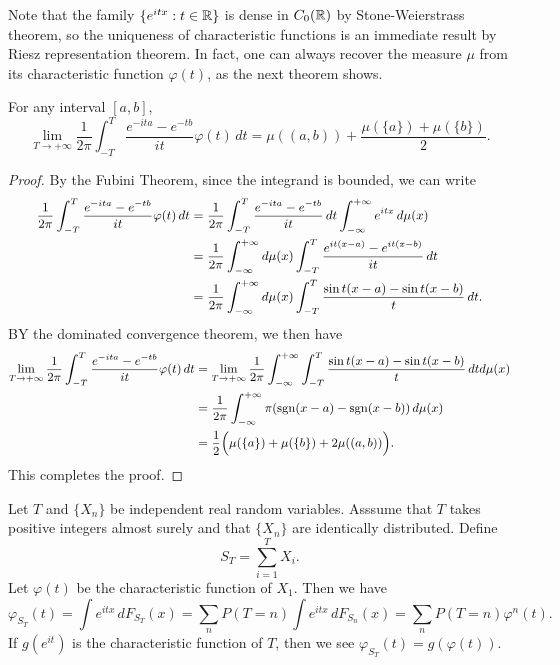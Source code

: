 Note that the family $\{e^{itx}:t\in\mathbb{R}\}$ is dense in $C_0(\mathbb{R})$ by Stone-Weierstrass theorem, so the uniqueness of characteristic functions is an immediate result by Riesz representation theorem. In fact, one can always recover the measure $\mu$ from its characteristic function $\varphi(t)$, as the next theorem shows.
\begin{theorem}\label{characteristic function inversion}
For any interval $[a,b]$,
\[\lim_{T\to+\infty}\frac{1}{2\pi}\int_{-T}^{T}\frac{e^{-it a}-e^{-t b}}{it}\varphi(t)\,dt=\mu((a,b))+\frac{\mu(\{a\})+\mu(\{b\})}{2}.\]
\end{theorem}
\begin{proof}
By the Fubini Theorem, since the integrand is bounded, we can write
\begin{equation*}\small
\begin{aligned}
\frac{1}{2\pi}\int_{-T}^{T}\frac{e^{-it a}-e^{-t b}}{it}\varphi(t)\,dt&=\frac{1}{2\pi}\int_{-T}^{T}\frac{e^{-it a}-e^{-t b}}{it}\,dt\int_{-\infty}^{+\infty}e^{it x}\,d\mu(x)\\
&=\frac{1}{2\pi}\int_{-\infty}^{+\infty}d\mu(x)\int_{-T}^{T}\frac{e^{it(x-a)}-e^{it(x-b)}}{it}\,dt\\
&=\frac{1}{2\pi}\int_{-\infty}^{+\infty}d\mu(x)\int_{-T}^{T}\frac{\sin t(x-a)-\sin t(x-b)}{t}\,dt.
\end{aligned}
\end{equation*}
BY the dominated convergence theorem, we then have
\begin{equation*}\small
\begin{aligned}
\lim_{T\to+\infty}\frac{1}{2\pi}\int_{-T}^{T}\frac{e^{-it a}-e^{-t b}}{it}\varphi(t)\,dt&=\lim_{T\to+\infty}\frac{1}{2\pi}\int_{-\infty}^{+\infty}\int_{-T}^{T}\frac{\sin t(x-a)-\sin t(x-b)}{t}\,dt d\mu(x)\\
&=\frac{1}{2\pi}\int_{-\infty}^{+\infty}\pi(\mathrm{sgn}(x-a)-\mathrm{sgn}(x-b))\,d\mu(x)\\
&=\frac{1}{2}\Big(\mu(\{a\})+\mu(\{b\})+2\mu((a,b))\Big).
\end{aligned}
\end{equation*}
This completes the proof.
\end{proof}
\begin{example}
Let $T$ and $\{X_n\}$ be independent real random variables. Asssume that $T$ takes positive integers almost surely and that $\{X_n\}$ are identically distributed. Define
\[S_T=\sum_{i=1}^{T}X_i.\]
Let $\varphi(t)$ be the characteristic function of $X_1$. Then we have
\[\varphi_{S_T}(t)=\int e^{itx}\,dF_{S_T}(x)=\sum_{n}P(T=n)\int e^{itx}\,dF_{S_n}(x)=\sum_nP(T=n)\varphi^n(t).\]
If $g(e^{it})$ is the characteristic function of $T$, then we see $\varphi_{S_T}(t)=g(\varphi(t))$.
\end{example}
